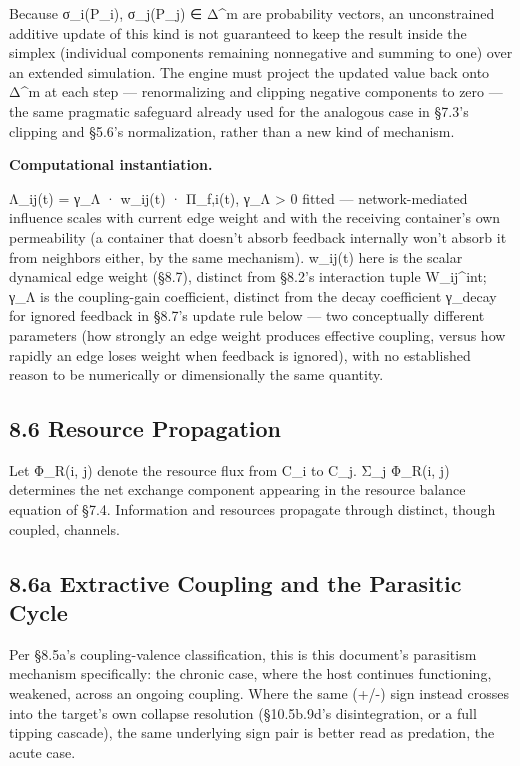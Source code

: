 \documentclass[
]{article}
\begin{document}
Because σ\_i(P\_i), σ\_j(P\_j) ∈ Δ\^{}m are probability vectors, an
unconstrained additive update of this kind is not guaranteed to keep the
result inside the simplex (individual components remaining nonnegative
and summing to one) over an extended simulation. The engine must project
the updated value back onto Δ\^{}m at each step --- renormalizing and
clipping negative components to zero --- the same pragmatic safeguard
already used for the analogous case in §7.3's clipping and §5.6's
normalization, rather than a new kind of mechanism.

\textbf{Computational instantiation.}

Λ\_ij(t) = γ\_Λ · w\_ij(t) · Π\_f,i(t), γ\_Λ \textgreater{} 0 fitted ---
network-mediated influence scales with current edge weight and with the
receiving container's own permeability (a container that doesn't absorb
feedback internally won't absorb it from neighbors either, by the same
mechanism). w\_ij(t) here is the scalar dynamical edge weight (§8.7),
distinct from §8.2's interaction tuple W\_ij\^{}int; γ\_Λ is the
coupling-gain coefficient, distinct from the decay coefficient γ\_decay
for ignored feedback in §8.7's update rule below --- two conceptually
different parameters (how strongly an edge weight produces effective
coupling, versus how rapidly an edge loses weight when feedback is
ignored), with no established reason to be numerically or dimensionally
the same quantity.

\hypertarget{resource-propagation}{%
\subsection{8.6 Resource Propagation}\label{resource-propagation}}

Let Φ\_R(i, j) denote the resource flux from C\_i to C\_j. Σ\_j Φ\_R(i,
j) determines the net exchange component appearing in the resource
balance equation of §7.4. Information and resources propagate through
distinct, though coupled, channels.

\hypertarget{a-extractive-coupling-and-the-parasitic-cycle}{%
\subsection{8.6a Extractive Coupling and the Parasitic
Cycle}\label{a-extractive-coupling-and-the-parasitic-cycle}}

Per §8.5a's coupling-valence classification, this is this document's
parasitism mechanism specifically: the chronic case, where the host
continues functioning, weakened, across an ongoing coupling. Where the
same (+/-) sign instead crosses into the target's own collapse
resolution (§10.5b.9d's disintegration, or a full tipping cascade), the
same underlying sign pair is better read as predation, the acute case.
\end{document}
